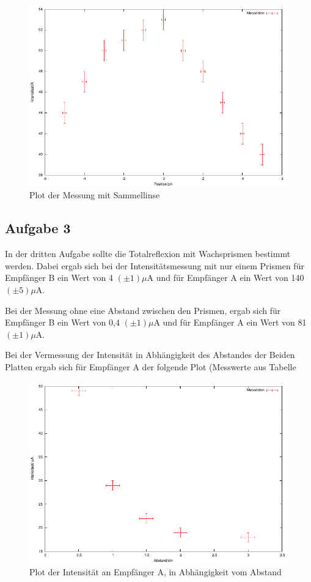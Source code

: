 \documentclass[12pt]{scrartcl}
\begin{document}
\begin{figure}[H]
\centering
    \includegraphics[scale = 1]{a_2_m.pdf}
  	\caption[Plot der Messung mit Sammellinse]{Plot der Messung mit Sammellinse}
  \label{fig:a_2_m}
\end{figure}



\subsection{Aufgabe 3}
In der dritten Aufgabe sollte die Totalreflexion mit Wachsprismen bestimmt werden.
Dabei ergab  sich bei der Intensitätsmessung mit nur einem Prismen  für Empfänger B ein Wert von 4	$(\pm 1) \mu$A und für Empfänger A ein Wert von 140 $(\pm 5) \mu$A.

Bei der Messung ohne eine Abstand zwischen den Prismen, ergab sich für Empfänger B ein Wert von 0,4 $(\pm 1) \mu$A und für Empfänger A ein Wert von 81 $(\pm 1) \mu$A.

Bei der Vermessung der Intensität in Abhängigkeit des Abstandes der Beiden Platten ergab sich für Empfänger A der folgende Plot (Messwerte aus Tabelle 

\begin{figure}[H]
\centering
    \includegraphics[scale = 1]{a_3_A.pdf}
  	\caption[Plot der Intensität an Empfänger A, in Abhängigkeit vom Abstand]{Plot der Intensität an Empfänger A, in Abhängigkeit vom Abstand}
  \label{fig:a_3_A}
\end{figure}
\end{document}
